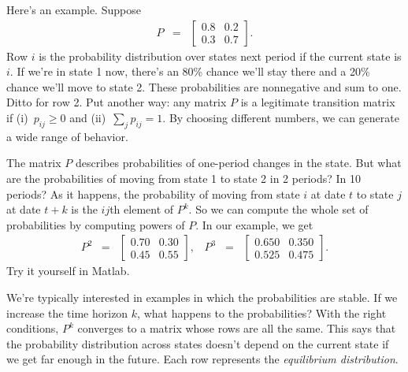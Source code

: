 \documentclass[11pt]{article}
\begin{document}
Here's an example.  Suppose
\begin{eqnarray*}
    P &=& \left[
            \begin{array}{cc}
            0.8 & 0.2 \\  0.3 & 0.7
            \end{array}
            \right] .
\end{eqnarray*}
Row $i$ is the probability distribution over states next period
if the current state is $i$.
If we're in state 1 now, there's an 80\% chance we'll stay there
and a 20\% chance we'll move to state 2.
These probabilities are nonnegative and sum to one.
Ditto for row 2.
Put another way:  any matrix $P$ is a legitimate transition matrix
if (i)~$p_{ij} \geq 0$ and (ii)~$\sum_j p_{ij} = 1$.
By choosing different numbers, we can generate a wide range of behavior.


The matrix $P$ describes probabilities of one-period changes in the state.
But what are the probabilities of moving from state 1 to state 2 in 2 periods?
In 10 periods?
As it happens, the probability of moving from state $i$ at date $t$ to state $j$
at date $t+k$ is the $ij$th element of $P^k$.
So we can compute the whole set of probabilities by computing powers of $P$.
In our example, we get
\begin{eqnarray*}
    P^2 &=& \left[
            \begin{array}{cc}
            0.70 & 0.30 \\  0.45 & 0.55
            \end{array}
            \right] , \;\;\;
    P^3 \;\;=\;\; \left[
            \begin{array}{cc}
            0.650 & 0.350 \\  0.525 & 0.475
            \end{array}
            \right] .
\end{eqnarray*}
Try it yourself in Matlab.


We're typically interested in examples in which the probabilities are stable.
If we increase the time horizon $k$, what happens to the probabilities?
With the right conditions,
$P^k$ converges to a matrix whose rows are all the same.
This says that the probability distribution across states doesn't depend
on the current state if we get far enough in the future.
Each row represents the {\it equilibrium distribution\/}.
\end{document}
